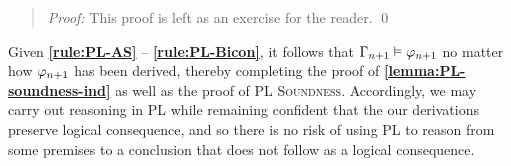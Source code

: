 
\begin{quote} 
  \textit{Proof:}
  This proof is left as an exercise for the reader.
  \qed
\end{quote}

Given \textbf{\ref{rule:PL-AS}} -- \textbf{\ref{rule:PL-Bicon}}, it follows that $\Gamma_{n+1} \vDash \varphi_{n+1}$ no matter how $\varphi_{n+1}$ has been derived, thereby completing the proof of \textbf{\ref{lemma:PL-soundness-ind}} as well as the proof of \textsc{PL Soundness}.
Accordingly, we may carry out reasoning in PL while remaining confident that the our derivations preserve logical consequence, and so there is no risk of using PL to reason from some premises to a conclusion that does not follow as a logical consequence.






